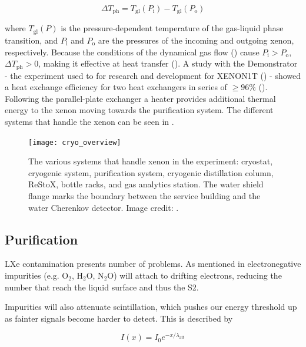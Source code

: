 \begin{equation}
\Delta T_{\mathrm{ph}} = T_{\mathrm{gl}} (P_{\mathrm{i}}) - T_{\mathrm{gl}} (P_{\mathrm{o}})
\label{eq:xenon1t_cryo_latent}
\end{equation}

\noindent where $T_{\mathrm{gl}} (P)$ is the pressure-dependent temperature of the gas-liquid phase transition, and $P_{\mathrm{i}}$ and
$P_{\mathrm{o}}$
are the pressures of the incoming and outgoing xenon, respectively.  Because the conditions of the dynamical gas flow
() cause $P_{\mathrm{i}} > P_{\mathrm{o}}$, $\Delta T_{\mathrm{ph}} > 0$, making it effective at heat transfer
().  A study with the Demonstrator - the
experiment used to for research and development for XENON1T () - showed a heat
exchange efficiency for
two heat exchangers in series of $\geq 96\%$ ().  Following the parallel-plate exchanger a heater provides additional
thermal energy to the xenon moving towards the purification system.  The different systems that handle the xenon can be seen in
.

\begin{figure}
\centering
\texttt{[image: cryo\_overview]}
\caption{The various systems that handle xenon in the experiment: cryostat, cryogenic system, purification system, cryogenic distillation
column, ReStoX, bottle racks, and gas analytics station.  The water shield flange marks the boundary between the service building and the
water Cherenkov detector.  Image credit: .}
\label{fig:xenon1t_cryo_overview}
\end{figure}



\subsection{Purification}
\label{subsec:xenon1t_pur}
LXe contamination presents number of problems.  As mentioned in  electronegative
impurities (e.g. O$_2$, H$_2$O, N$_2$O) will attach to drifting electrons, reducing the number that reach
the liquid surface and thus the S2.

Impurities will also attenuate scintillation, which pushes our energy threshold up as fainter signals become harder to detect.  This is
described by

\begin{equation}
I(x) = I_0 e^{-x / \lambda_{\mathrm{att}}}
\label{eq:xenon1t_pur_atten}
\end{equation}

